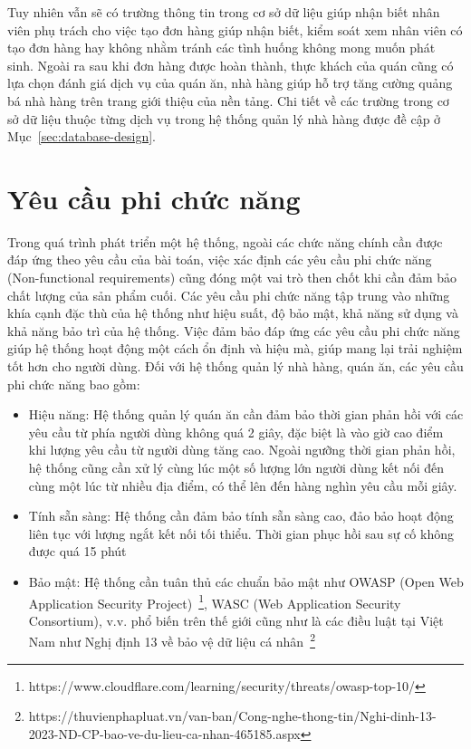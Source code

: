 Tuy nhiên vẫn sẽ có trường thông tin trong cơ sở dữ liệu giúp nhận biết nhân viên phụ trách cho việc tạo đơn hàng giúp nhận biết, kiểm soát xem nhân viên có tạo đơn hàng hay không nhằm tránh các tình huống không mong muốn phát sinh.
Ngoài ra sau khi đơn hàng được hoàn thành, thực khách của quán cũng có lựa chọn đánh giá dịch vụ của quán ăn, nhà hàng giúp hỗ trợ tăng cường quảng bá nhà hàng trên trang giới thiệu của nền tảng.
Chi tiết về các trường trong cơ sở dữ liệu thuộc từng dịch vụ trong hệ thống quản lý nhà hàng được đề cập ở Mục~\ref{sec:database-design}.

\section{Yêu cầu phi chức năng}
Trong quá trình phát triển một hệ thống, ngoài các chức năng chính cần được đáp ứng theo yêu cầu của bài toán, việc xác định các yêu cầu phi chức năng (Non-functional requirements) cũng đóng một vai trò then chốt khi cần đảm bảo chất lượng của sản phẩm cuối.
Các yêu cầu phi chức năng tập trung vào những khía cạnh đặc thù của hệ thống như hiệu suất, độ bảo mật, khả năng sử dụng và khả năng bảo trì của hệ thống.
Việc đảm bảo đáp ứng các yêu cầu phi chức năng giúp hệ thống hoạt động một cách ổn định và hiệu mà, giúp mang lại trải nghiệm tốt hơn cho người dùng.
Đối với hệ thống quản lý nhà hàng, quán ăn, các yêu cầu phi chức năng bao gồm:
\begin{itemize}
    \item Hiệu năng: Hệ thống quản lý quán ăn cần đảm bảo thời gian phản hồi với các yêu cầu từ phía người dùng không quá 2 giây, đặc biệt là vào giờ cao điểm khi lượng yêu cầu từ người dùng tăng cao.
    Ngoài ngưỡng thời gian phản hồi, hệ thống cũng cần xử lý cùng lúc một số lượng lớn người dùng kết nối đến cùng một lúc từ nhiều địa điểm, có thể lên đến hàng nghìn yêu cầu mỗi giây.
    \item Tính sẵn sàng: Hệ thống cần đảm bảo tính sẵn sàng cao, đảo bảo hoạt động liên tục với lượng ngắt kết nối tối thiểu.
    Thời gian phục hồi sau sự cố không được quá 15 phút
    \item Bảo mật: Hệ thống cần tuân thủ các chuẩn bảo mật như OWASP (Open Web Application Security Project)~\footnote{https://www.cloudflare.com/learning/security/threats/owasp-top-10/}, WASC (Web Application Security Consortium), v.v. phổ biến trên thế giới cũng như là các điều luật tại Việt Nam như Nghị định 13 về bảo vệ dữ liệu cá nhân~\footnote{https://thuvienphapluat.vn/van-ban/Cong-nghe-thong-tin/Nghi-dinh-13-2023-ND-CP-bao-ve-du-lieu-ca-nhan-465185.aspx}
\end{itemize}

